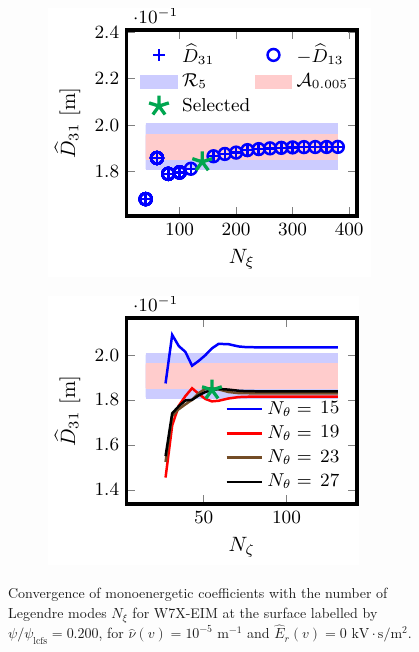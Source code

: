 \documentclass[10pt]{iopart}
\begin{document}
\begin{figure}[h]
	\begin{subfigure}[t]{0.32\textwidth}
		\includegraphics{Convergence-Legendre-W7X-EIM-s0200-Er-0-D31-Detail}
		\caption{}
		\label{subfig:D31_convergence_Legendre_W7X_EIM_0200_Erho_0_Detail}
	\end{subfigure}
	\begin{subfigure}[t]{0.32\textwidth}
		\includegraphics{Convergence-theta-zeta-W7X-EIM-s0200-Er-0-D31}
%		
		\caption{}
		\label{subfig:D31_convergence_theta_zeta_W7X_EIM_0200_Erho_0}
	\end{subfigure}
	\caption{Convergence of monoenergetic coefficients with the number of Legendre modes $N_\xi$ for W7X-EIM at the surface labelled by $\psi/\psi_{\text{lcfs}}=0.200$, for $\hat{\nu}(v)=10^{-5}$ $\text{m}^{-1}$ and $\widehat{E}_r(v)=0$ $\text{kV}\cdot\text{s}/\text{m}^2$.}
	\label{fig:Convergence_W7X_EIM_Er_0}
\end{figure}
\end{document}
